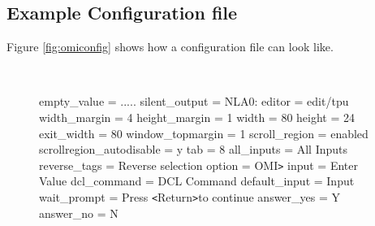 \documentclass[a4paper]{book}
\newcommand{\lt}{\texttt{<}}
\newcommand{\gt}{\texttt{>}}
\renewcommand{\indent}{\hspace*{5mm}}
\begin{document}
\subsection{Example Configuration file}
\label{subsubsec:example}

Figure \ref{fig:omiconfig} shows how a configuration file can look like.

\begin{figure}[h!tb]
\begin{minipage}[h!tb]{\textwidth}
\hrulefill \\
\begin{ttfamily}
\noindent[main] \newline
\indent empty{\_}value = ..... \newline
\indent silent{\_}output = NLA0: \newline
\indent editor = edit/tpu \newline
 \newline
\noindent[screen] \newline
\indent width{\_}margin = 4 \newline
\indent height{\_}margin = 1 \newline
\indent width = 80 \newline
\indent height = 24 \newline
\indent exit{\_}width = 80 \newline
\indent window{\_}topmargin = 1 \newline
\indent scroll{\_}region = enabled \newline
\indent scrollregion{\_}autodisable = y \newline
\indent tab = 8 \newline
 \newline
\noindent[questions] \newline
\indent all{\_}inputs = All Inputs \newline
\indent reverse{\_}tags = Reverse selection \newline
\indent option = OMI\gt  \newline
\indent input = Enter Value \newline
\indent dcl{\_}command = DCL Command \newline
\indent default{\_}input = Input \newline
\indent wait{\_}prompt = Press \lt Return\gt  to continue \newline
\indent answer{\_}yes = Y \newline
\indent answer{\_}no = N \newline

\end{ttfamily}
\end{minipage}
\end{figure}
\end{document}
